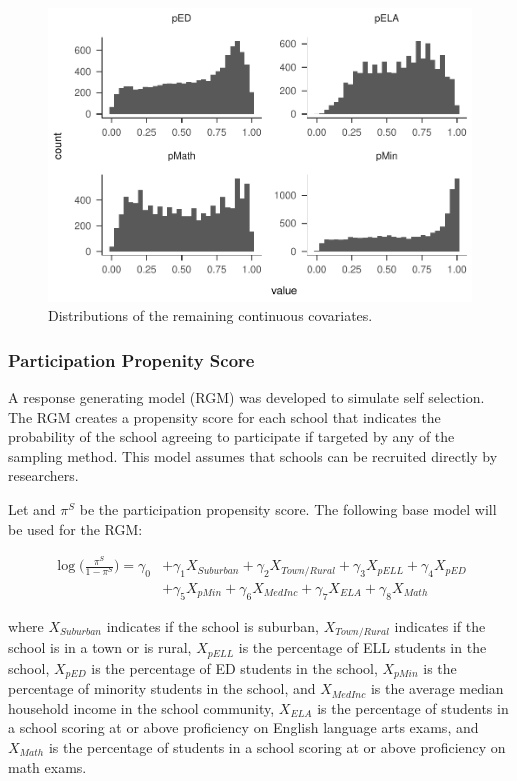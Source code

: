 \documentclass[man,floatsintext]{apa6}
\begin{document}
\begin{figure}
\centering
\includegraphics{GenSamp_Paper_files/figure-latex/plot-dist2-1.pdf}
\caption{\label{fig:plot-dist2}Distributions of the remaining continuous covariates.}
\end{figure}

\hypertarget{participation-propenity-score}{%
\subsubsection{Participation Propenity Score}\label{participation-propenity-score}}

A response generating model (RGM) was developed to simulate self selection. The RGM creates a propensity score for each school that indicates the probability of the school agreeing to participate if targeted by any of the sampling method. This model assumes that schools can be recruited directly by researchers.

Let and \(\pi^S\) be the participation propensity score. The following base model will be used for the RGM:

\begin{align} \label{eq:sRGM}
  \log\bigg(\frac{\pi^S}{1-\pi^S}\bigg) = \gamma_{0} &+ \gamma_{1}X_{Suburban} + \gamma_{2}X_{Town/Rural} + \gamma_{3}X_{pELL} + \gamma_{4}X_{pED} 
  \\
  &+ \gamma_{5}X_{pMin} + \gamma_{6}X_{MedInc} + \gamma_{7}X_{ELA} + \gamma_{8}X_{Math} \nonumber
\end{align}

where \(X_{Suburban}\) indicates if the school is suburban, \(X_{Town/Rural}\) indicates if the school is in a town or is rural, \(X_{pELL}\) is the percentage of ELL students in the school, \(X_{pED}\) is the percentage of ED students in the school, \(X_{pMin}\) is the percentage of minority students in the school, and \(X_{MedInc}\) is the average median household income in the school community, \(X_{ELA}\) is the percentage of students in a school scoring at or above proficiency on English language arts exams, and \(X_{Math}\) is the percentage of students in a school scoring at or above proficiency on math exams.
\end{document}
